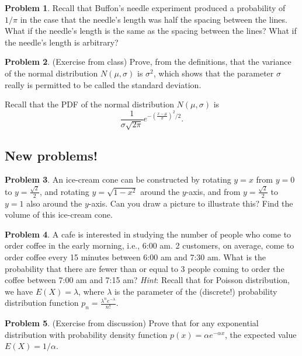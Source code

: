\documentclass[11pt,oneside]{amsart}
\theoremstyle{definition}
\newtheorem{problem}{Problem}
\begin{document}
\begin{problem}
Recall that Buffon's needle experiment produced a probability of $1/\pi$ in the case that the needle's length was half the spacing between the lines. What if the needle's length is the same as the spacing between the lines? What if the needle's length is arbitrary?
\end{problem}

\begin{problem}
(Exercise from class) Prove, from the definitions, that the variance of the normal distribution $N(\mu,\sigma)$ is $\sigma^2$, which shows that the parameter $\sigma$ really is permitted to be called the standard deviation.

Recall that the PDF of the normal distribution $N(\mu,\sigma)$ is
\[\frac 1{\sigma\sqrt{2\pi}}e^{-\left(\frac{x-\mu}\sigma\right)^2/2}.\]
\end{problem}

\subsection*{New problems!}

\begin{problem}
An ice-cream cone can be constructed by rotating $y=x$ from $y=0$ to $y=\frac{\sqrt{2}}{2}$, and rotating $y=\sqrt{1-x^2}$ around the $y$-axis, and from $y=\frac{\sqrt{2}}{2}$ to $y=1$ also around the $y$-axis. Can you draw a picture to illustrate this? Find the volume of this ice-cream cone.
\end{problem}

\begin{problem}
A cafe is interested in studying the number of people who come to order coffee in the early morning, i.e., 6:00 am. 2 customers, on average, come to order coffee every 15 minutes between 6:00 am and 7:30 am. What is the probability that there are fewer than or equal to 3 people coming to order the coffee between 7:00 am and 7:15 am?
\newline
\textit{Hint}: Recall that for Poisson distribution, we have $E(X)=\lambda$, where $\lambda$ is the parameter of the (discrete!) probability distribution function $p_n=\frac{\lambda^n e^{-\lambda}}{n!}$.
\end{problem}

\begin{problem}
(Exercise from discussion) Prove that for any exponential distribution with probability density function $p(x)=\alpha e^{-\alpha x}$, the expected value $E(X)=1/\alpha$.
\end{problem}
\end{document}
